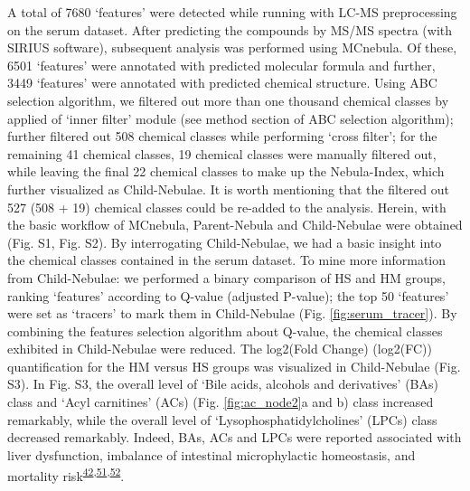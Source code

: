 \documentclass[
]{article}
\begin{document}
A total of 7680 `features' were detected while running with LC-MS
preprocessing on the serum dataset. After predicting the compounds by
MS/MS spectra (with SIRIUS software), subsequent analysis was performed
using MCnebula. Of these, 6501 `features' were annotated with predicted
molecular formula and further, 3449 `features' were annotated with
predicted chemical structure. Using ABC selection algorithm, we filtered
out more than one thousand chemical classes by applied of `inner filter'
module (see method section of ABC selection algorithm); further filtered
out 508 chemical classes while performing `cross filter'; for the
remaining 41 chemical classes, 19 chemical classes were manually
filtered out, while leaving the final 22 chemical classes to make up the
Nebula-Index, which further visualized as Child-Nebulae. It is worth
mentioning that the filtered out 527 (508 + 19) chemical classes could
be re-added to the analysis. Herein, with the basic workflow of
MCnebula, Parent-Nebula and Child-Nebulae were obtained (Fig. S1, Fig.
S2). By interrogating Child-Nebulae, we had a basic insight into the
chemical classes contained in the serum dataset. To mine more
information from Child-Nebulae: we performed a binary comparison of HS
and HM groups, ranking `features' according to Q-value (adjusted
P-value); the top 50 `features' were set as `tracers' to mark them in
Child-Nebulae (Fig. \ref{fig:serum_tracer}). By combining the features
selection algorithm about Q-value, the chemical classes exhibited in
Child-Nebulae were reduced. The log2(Fold Change) (log2(FC))
quantification for the HM versus HS groups was visualized in
Child-Nebulae (Fig. S3). In Fig. S3, the overall level of `Bile acids,
alcohols and derivatives' (BAs) class and `Acyl carnitines' (ACs) (Fig.
\ref{fig:ac_node2}a and b) class increased remarkably, while the overall
level of `Lysophosphatidylcholines' (LPCs) class decreased remarkably.
Indeed, BAs, ACs and LPCs were reported associated with liver
dysfunction, imbalance of intestinal microphylactic homeostasis, and
mortality
risk\textsuperscript{\protect\hyperlink{ref-2020s}{42},\protect\hyperlink{ref-2021db}{51},\protect\hyperlink{ref-2016at}{52}}.
\end{document}
